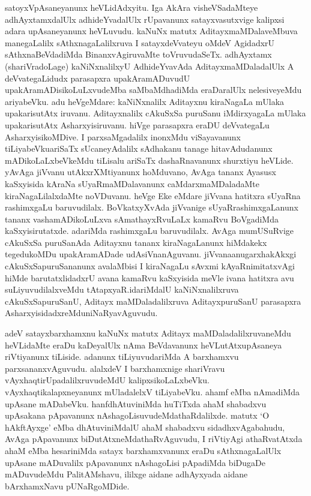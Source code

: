 
\begin{artha}
satoyxVpAsaneyanunx heVLidAdxyitu. Iga AkAra visheVSadaMteye adhAyxtamxdalUlx adhideYvadalUlx rUpavanunx satayxvasutxvige kalipxsi adara upAsaneyanunx heVLuvudu. kaNuNx matutx AditayxmaMDalaveMbuva manegaLalilx sAthxnagaLalilxruva I satayxdeVvateyu oMdeV AgidadxrU sAthxnaBeVdadiMda BinanxvAgiruvaMte toVruvudaSeTx. adhAyxtamx (shariVradoLage) kaNiNxnalilxyU AdhideYvavAda AditayxmaMDaladalUlx  A deVvategaLidudx parasapxra upakAramADuvudU upakAramADisikoLuLxvudeMba saMbaMdhadiMda eraDaralUlx nelesiveyeMdu ariyabeVku. adu heVgeMdare: kaNiNxnalilx Aditayxnu kiraNagaLa mUlaka upakarisutAtx iruvanu. Aditayxnalilx cAkuSxSa puruSanu iMdirxyagaLa mUlaka upakarisutAtx Asharxyisiruvanu. hiVge parasapxra eraDU deVvategaLu AsharxyisikoMDive. I parxsaMgadalilx inonxMdu viSayavanunx tiLiyabeVku\ndash  ariSaTx sUcaneyAdalilx sAdhakanu tanage hitavAdudanunx mADikoLaLxbeVkeMdu tiLisalu ariSaTx dashaRnavanunx shurxtiyu heVLide. yAvAga jiVvanu utAkxrXMtiyanunx hoMduvano, AvAga tananx Ayasusx kaSxyisida kAraNa sUyaRmaMDalavanunx caMdarxmaMDaladaMte kiraNagaLilalxdaMte noVDuvanu. heVge Eke eMdare jiVvana hatitxra sUyaRna rashimxgaLu baruvudilalx. BoVkatxyXvAda jiVvanige sUyaRrashimxgaLanunx tananx vashamADikoLuLxva sAmathayxRvuLaLx kamaRvu BoVgadiMda kaSxyisirutatxde. adariMda rashimxgaLu baruvudilalx. AvAga mumUSuRvige cAkuSxSa puruSanAda Aditayxnu tananx kiraNagaLanunx hiMdakekx tegedukoMDu upakAramADade udAsiVnanAguvanu. jiVvana\break anugarxhakAkxgi cAkuSxSapuruSananunx avalaMbisi I kiraNagaLu sAvxmi kAyaRnimitatxvAgi hiMde barutatxlidadxrU avana kamaRvu kaSxyisida meVle ivana hatitxra avu suLiyuvudilalxveMdu tAtapxyaR.\break idariMdalU kaNiNxnalilxruva cAkuSxSapuruSanU, Aditayx maMDaladalilxruva AditayxpuruSanU parasapxra AsharxyisidadxreMdu\break niNaRyavAguvudu. 
\end{artha}


\begin{artha}
adeV satayxbarxhamxnu kaNuNx matutx Aditayx maMDaladalilxruvaneMdu heVLidaMte eraDu kaDeyalUlx nAma BeVdavanunx heVLutAtx\break upAsaneya riVtiyanunx tiLiside. adanunx tiLiyuvudariMda A barxhamxvu parxsananxvAguvudu. alalxdeV I barxhamxnige shariVravu vAyxhaqtirUpadalilxruvudeMdU kalipxsikoLaLxbeVku. vAyxhaqtikalapxneyanunx mUladalelxV tiLiyabeVku. a{ha}mf eMba nAmadiMda upAsane mADabeVku. hanfdhAtuviniMda huTiTxda ahaM shabadxvu upAsakana pApavanunx nAshagoLisuvudeMdathaRdalilxde. matutx `O hAkftAyxge' eMba dhAtuviniMdalU ahaM shabadxvu sidadhxvAgabahudu, AvAga pApavanunx biDutAtxneMdathaRvAguvudu, I riVtiyAgi athaRvatAtxda ahaM eMba hesariniMda satayx barxhamxvanunx eraDu sAthxnagaLalUlx upAsane mADuvalilx pApavanunx nAshagoLisi pApadiMda biDugaDe mADuvudeMdu PalitAMshavu, ililxge aidane adhAyxyada aidane bArxhamxNavu pUNaRgoMDide.
\end{artha}

